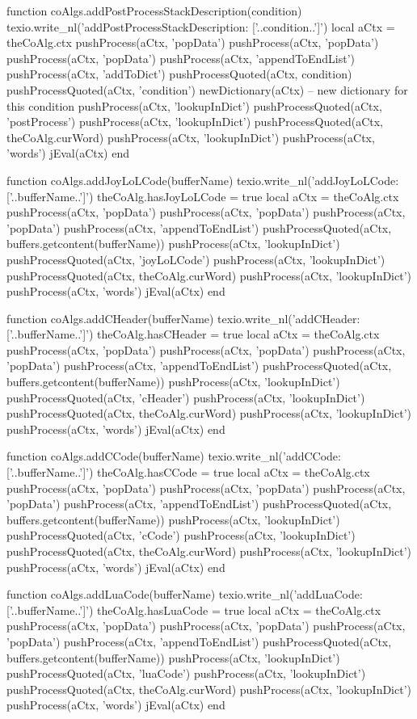 function coAlgs.addPostProcessStackDescription(condition)
  texio.write_nl('addPostProcessStackDescription: ['..condition..']')
  local aCtx = theCoAlg.ctx
  pushProcess(aCtx, 'popData')
  pushProcess(aCtx, 'popData')
  pushProcess(aCtx, 'popData')
  pushProcess(aCtx, 'appendToEndList')
  pushProcess(aCtx, 'addToDict')
  pushProcessQuoted(aCtx, condition)
  pushProcessQuoted(aCtx, 'condition')
  newDictionary(aCtx) -- new dictionary for this condition
  pushProcess(aCtx, 'lookupInDict')
  pushProcessQuoted(aCtx, 'postProcess')
  pushProcess(aCtx, 'lookupInDict')
  pushProcessQuoted(aCtx, theCoAlg.curWord)
  pushProcess(aCtx, 'lookupInDict')
  pushProcess(aCtx, 'words')
  jEval(aCtx)
end

function coAlgs.addJoyLoLCode(bufferName)
  texio.write_nl('addJoyLoLCode: ['..bufferName..']')
  theCoAlg.hasJoyLoLCode = true
  local aCtx = theCoAlg.ctx
  pushProcess(aCtx, 'popData')
  pushProcess(aCtx, 'popData')
  pushProcess(aCtx, 'popData')
  pushProcess(aCtx, 'appendToEndList')
  pushProcessQuoted(aCtx, buffers.getcontent(bufferName))
  pushProcess(aCtx, 'lookupInDict')
  pushProcessQuoted(aCtx, 'joyLoLCode')
  pushProcess(aCtx, 'lookupInDict')
  pushProcessQuoted(aCtx, theCoAlg.curWord)
  pushProcess(aCtx, 'lookupInDict')
  pushProcess(aCtx, 'words')
  jEval(aCtx)
end

function coAlgs.addCHeader(bufferName)
  texio.write_nl('addCHeader: ['..bufferName..']')
  theCoAlg.hasCHeader = true
  local aCtx = theCoAlg.ctx
  pushProcess(aCtx, 'popData')
  pushProcess(aCtx, 'popData')
  pushProcess(aCtx, 'popData')
  pushProcess(aCtx, 'appendToEndList')
  pushProcessQuoted(aCtx, buffers.getcontent(bufferName))
  pushProcess(aCtx, 'lookupInDict')
  pushProcessQuoted(aCtx, 'cHeader')
  pushProcess(aCtx, 'lookupInDict')
  pushProcessQuoted(aCtx, theCoAlg.curWord)
  pushProcess(aCtx, 'lookupInDict')
  pushProcess(aCtx, 'words')
  jEval(aCtx)
end

function coAlgs.addCCode(bufferName)
  texio.write_nl('addCCode: ['..bufferName..']')
  theCoAlg.hasCCode = true
  local aCtx = theCoAlg.ctx
  pushProcess(aCtx, 'popData')
  pushProcess(aCtx, 'popData')
  pushProcess(aCtx, 'popData')
  pushProcess(aCtx, 'appendToEndList')
  pushProcessQuoted(aCtx, buffers.getcontent(bufferName))
  pushProcess(aCtx, 'lookupInDict')
  pushProcessQuoted(aCtx, 'cCode')
  pushProcess(aCtx, 'lookupInDict')
  pushProcessQuoted(aCtx, theCoAlg.curWord)
  pushProcess(aCtx, 'lookupInDict')
  pushProcess(aCtx, 'words')
  jEval(aCtx)
end

function coAlgs.addLuaCode(bufferName)
  texio.write_nl('addLuaCode: ['..bufferName..']')
  theCoAlg.hasLuaCode = true
  local aCtx = theCoAlg.ctx
  pushProcess(aCtx, 'popData')
  pushProcess(aCtx, 'popData')
  pushProcess(aCtx, 'popData')
  pushProcess(aCtx, 'appendToEndList')
  pushProcessQuoted(aCtx, buffers.getcontent(bufferName))
  pushProcess(aCtx, 'lookupInDict')
  pushProcessQuoted(aCtx, 'luaCode')
  pushProcess(aCtx, 'lookupInDict')
  pushProcessQuoted(aCtx, theCoAlg.curWord)
  pushProcess(aCtx, 'lookupInDict')
  pushProcess(aCtx, 'words')
  jEval(aCtx)
end


